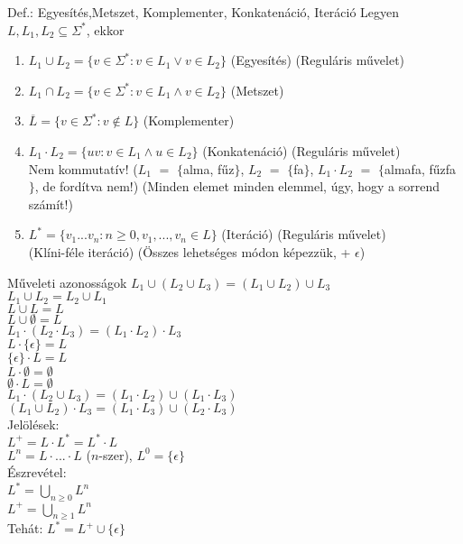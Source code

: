 \documentclass{beamer}
\begin{document}
\begin{frame}
\begin{block}{Def.: Egyesítés,Metszet, Komplementer, Konkatenáció, Iteráció}
Legyen $L, L_1, L_2 \subseteq {\Sigma}^*$, ekkor\\
\medskip
\begin{enumerate}
\item $L_1 \cup L_2 = \{v \in {\Sigma}^* : v \in L_1 \lor v \in L_2\}$ (Egyesítés) (Reguláris művelet)
\item $L_1 \cap L_2 = \{v \in {\Sigma}^* : v \in L_1 \land v \in L_2\}$ (Metszet)
\item $\overline{L} = \{v \in {\Sigma}^* : v \notin L\}$ (Komplementer)
\item $L_1 \cdot  L_2 = \{uv : v \in L_1 \land u \in L_2\}$ (Konkatenáció) (Reguláris művelet)\\
Nem kommutatív! ($L_1$ $=$ $\{$alma, fűz$\}$, $L_2$ $=$ $\{$fa$\}$, $L_1 \cdot L_2$ $=$ $\{$almafa, fűzfa$\}$, de fordítva nem!) (Minden elemet minden elemmel, úgy, hogy a sorrend számít!)
\item $L^* = \{v_1...v_n : n \geq 0, v_1, ..., v_n \in L\}$ (Iteráció) (Reguláris művelet)\\
(Klíni-féle iteráció) (Összes lehetséges módon képezzük, + $\epsilon$)
\end{enumerate}
\end{block}

\end{frame}

\begin{frame}
\begin{block}{Műveleti azonosságok}
$L_1 \cup (L_2 \cup L_3) = (L_1 \cup L_2) \cup L_3$\\
$L_1 \cup L_2 = L_2  \cup L_1$\\
$L \cup L = L$\\
$L \cup \emptyset = L$\\
\bigskip
$L_1 \cdot (L_2 \cdot L_3) = (L_1 \cdot L_2) \cdot L_3$\\
$L \cdot \{{\epsilon}\} = L$\\
$\{{\epsilon}\} \cdot L = L$\\
$L \cdot \emptyset = \emptyset$\\
$\emptyset \cdot L = \emptyset$\\
\bigskip
$L_1 \cdot (L_2 \cup L_3) = (L_1 \cdot L_2) \cup (L_1 \cdot L_3)$\\
$(L_1 \cup L_2) \cdot L_3 = (L_1 \cdot L_3) \cup (L_2 \cdot L_3)$\\
\bigskip
Jelölések:\\
\medskip
$L^+ = L \cdot L^* = L^* \cdot L$\\
$L^n = L \cdot ... \cdot L$ ($n$-szer), $L^0 = \{{\epsilon}\}$\\
\medskip
Észrevétel:\\
\medskip
$L^* = \bigcup_{n \geq 0} L^n$\\
$L^+ = \bigcup_{n \geq 1} L^n$\\
\smallskip
Tehát: $L^* = L^+ \cup \{{\epsilon}\}$
\end{block}

\end{frame}
\end{document}
